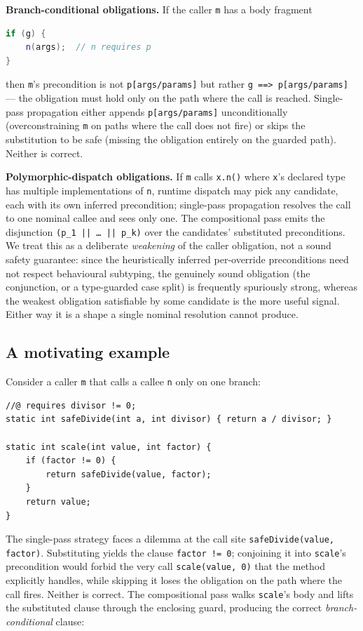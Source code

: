 \textbf{Branch-conditional obligations.} If the caller \texttt{m} has a
body fragment
\begin{lstlisting}[language=Java,frame=none]
if (g) {
    n(args);  // n requires p
}
\end{lstlisting}
then \texttt{m}'s precondition is not \texttt{p[args/params]} but
rather \texttt{g ==> p[args/params]} --- the obligation must hold only
on the path where the call is reached. Single-pass propagation either
appends \texttt{p[args/params]} unconditionally (overconstraining
\texttt{m} on paths where the call does not fire) or skips the
substitution to be safe (missing the obligation entirely on the
guarded path). Neither is correct.

\textbf{Polymorphic-dispatch obligations.} If \texttt{m} calls
\texttt{x.n()} where \texttt{x}'s declared type has multiple
implementations of \texttt{n}, runtime dispatch may pick any
candidate, each with its own inferred precondition; single-pass
propagation resolves the call to one nominal callee and sees only
one. The compositional pass emits the disjunction
\texttt{(p\_1 || \dots\ || p\_k)} over the candidates' substituted
preconditions. We treat this as a deliberate \emph{weakening} of the
caller obligation, not a sound safety guarantee: since the
heuristically inferred per-override preconditions need not respect
behavioural subtyping, the genuinely sound obligation (the
conjunction, or a type-guarded case split) is frequently spuriously
strong, whereas the weakest obligation satisfiable by some candidate
is the more useful signal. Either way it is a shape a single nominal
resolution cannot produce.

\subsection{A motivating example}
\label{sec:motivating}

Consider a caller \texttt{m} that calls a callee \texttt{n} only on one branch:

\begin{lstlisting}
//@ requires divisor != 0;
static int safeDivide(int a, int divisor) { return a / divisor; }

static int scale(int value, int factor) {
    if (factor != 0) {
        return safeDivide(value, factor);
    }
    return value;
}
\end{lstlisting}

The single-pass strategy faces a dilemma at the call site
\texttt{safeDivide(value, factor)}. Substituting yields the clause
\texttt{factor != 0}; conjoining it into \texttt{scale}'s precondition would
forbid the very call \texttt{scale(value, 0)} that the method explicitly
handles, while skipping it loses the obligation on the path where the call
fires. Neither is correct. The compositional pass walks \texttt{scale}'s body
and lifts the substituted clause through the enclosing guard, producing the
correct \emph{branch-conditional} clause:

